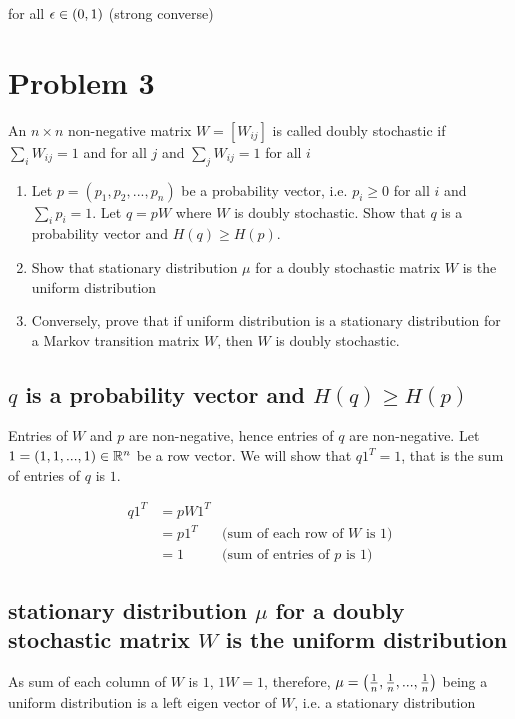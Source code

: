 \documentclass{article}
\begin{document}
for all $\eps \in (0, 1)$ (strong converse)

\section{Problem 3}
An $n \times n$ non-negative matrix $W = [W_{ij}]$ is called doubly stochastic if $\sum_{i} W_{ij} = 1$ and for all $j$ and $\sum_{j} W_{ij} = 1$ for all $i$

\begin{enumerate}
\item Let $p = (p_1, p_2, ..., p_n)$ be a probability vector, i.e. $p_i \geq 0$ for all $i$ and $\sum_{i} p_i = 1$. Let $q = pW$ where $W$ is doubly stochastic. Show that $q$ is a probability vector and $H(q) \geq H(p)$.

\item Show that stationary distribution $\mu$ for a doubly stochastic matrix $W$ is the uniform distribution

\item Conversely, prove that if uniform distribution is a stationary distribution for a Markov transition matrix $W$, then $W$ is doubly stochastic.
\end{enumerate}

\subsection{$q$ is a probability vector and $H(q) \geq H(p)$}

Entries of $W$ and $p$ are non-negative, hence entries of $q$ are non-negative. Let $1 = (1, 1, ..., 1) \in \R^n$ be a row vector. We will show that $q 1^T = 1$, that is the sum of entries of $q$ is $1$.

\begin{align*}
    q 1^T
    &= p W 1^T \\
    &= p 1^T &\text{(sum of each row of $W$ is $1$)} \\
    &= 1 &\text{(sum of entries of $p$ is $1$)}
\end{align*}

\subsection{stationary distribution $\mu$ for a doubly stochastic matrix $W$ is the uniform distribution}

As sum of each column of $W$ is $1$, $1 W = 1$, therefore, $\mu = \tuple*{\frac{1}{n}, \frac{1}{n}, ..., \frac{1}{n}}$ being a uniform distribution is a left eigen vector of $W$, i.e. a stationary distribution
\end{document}
